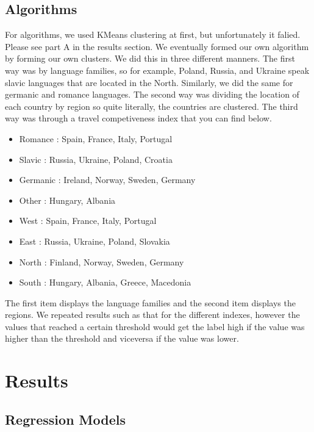 \documentclass[conference]{IEEEtran}
\begin{document}
\subsection{Algorithms}

For algorithms, we used KMeans clustering at first, but unfortunately it falied. Please see part A in the results section. We eventually formed our own algorithm by forming our own clusters. We did this in three different manners. The first way was by language families, so for example, Poland, Russia, and Ukraine speak slavic languages that are located in the North. Similarly, we did the same for germanic and romance languages. The second way was dividing the location of each country by region so quite literally, the countries are clustered. The third way was through a travel competiveness index that you can find below.

\begin{itemize}
\item Romance : Spain, France, Italy, Portugal
\item Slavic : Russia, Ukraine, Poland, Croatia
\item Germanic : Ireland, Norway, Sweden, Germany
\item Other : Hungary, Albania
\end{itemize}

\begin{itemize}
\item West : Spain, France, Italy, Portugal
\item East : Russia, Ukraine, Poland, Slovakia
\item North : Finland, Norway, Sweden, Germany
\item South : Hungary, Albania, Greece, Macedonia
\end{itemize}

The first item displays the language families and the second item displays the regions. We repeated results such as that for the different indexes, however the values that reached a certain threshold would get the label high if the value was higher than the threshold and viceversa if the value was lower.

\section{Results}

\subsection{Regression Models}
\end{document}
